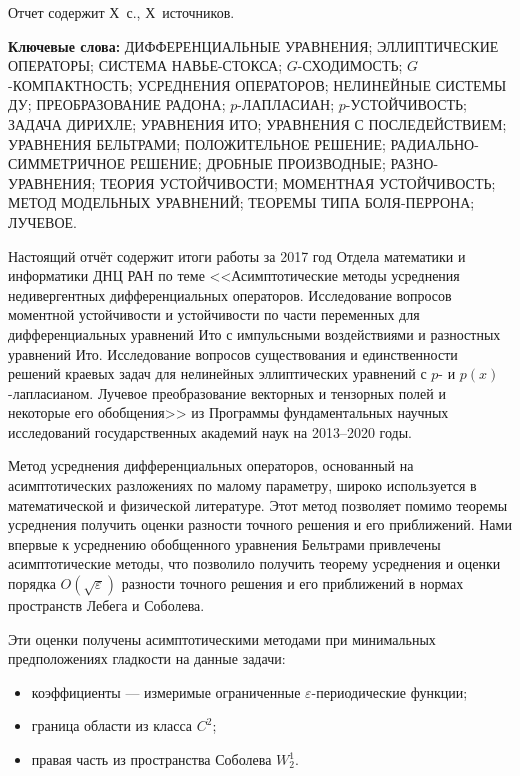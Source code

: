\Referat %

Отчет содержит Х~с., Х~источников.%

\bigskip
\textbf{ Ключевые
	слова:}
ДИФФЕРЕНЦИАЛЬНЫЕ УРАВНЕНИЯ; ЭЛЛИПТИЧЕСКИЕ ОПЕРАТОРЫ; СИСТЕМА НАВЬЕ-СТОКСА; $G$-СХОДИМОСТЬ; $G$-КОМПАКТНОСТЬ; УСРЕДНЕНИЯ ОПЕРАТОРОВ; НЕЛИНЕЙНЫЕ СИСТЕМЫ ДУ;
ПРЕОБРАЗОВАНИЕ РАДОНА;
$p$-ЛАПЛАСИАН; $p$-УСТОЙЧИВОСТЬ; ЗАДАЧА ДИРИХЛЕ; УРАВНЕНИЯ ИТО; УРАВНЕНИЯ С ПОСЛЕДЕЙСТВИЕМ;  УРАВНЕНИЯ БЕЛЬТРАМИ; ПОЛОЖИТЕЛЬНОЕ РЕШЕНИЕ; РАДИАЛЬНО-СИММЕТРИЧНОЕ РЕШЕНИЕ; ДРОБНЫЕ ПРОИЗВОДНЫЕ; РАЗНО- УРАВНЕНИЯ;  ТЕОРИЯ УСТОЙЧИВОСТИ; МОМЕНТНАЯ УСТОЙЧИВОСТЬ; МЕТОД МОДЕЛЬНЫХ УРАВНЕНИЙ; ТЕОРЕМЫ ТИПА БОЛЯ-ПЕРРОНА; ЛУЧЕВОЕ.

\bigskip

Настоящий отчёт содержит итоги работы за 2017 год Отдела математики и информатики ДНЦ РАН по теме
<<Асимптотические методы усреднения недивергентных дифференциальных операторов. Исследование вопросов моментной устойчивости и устойчивости по части переменных для дифференциальных уравнений Ито с импульсными воздействиями и разностных уравнений Ито. Исследование вопросов существования и единственности решений краевых задач для нелинейных эллиптических уравнений с $p$- и $p(x)$-лапласианом. Лучевое преобразование векторных и тензорных полей и некоторые его обобщения>>
из Программы фундаментальных научных исследований государственных академий наук на 2013–2020 годы.



Метод усреднения дифференциальных операторов, основанный на асимптотических разложениях по малому параметру, широко используется  в математической и физической литературе. Этот метод позволяет помимо теоремы усреднения получить оценки разности точного решения и его приближений. Нами впервые к усреднению обобщенного уравнения Бельтрами привлечены асимптотические методы, что позволило получить теорему усреднения и оценки порядка $O(\sqrt{\varepsilon})$ разности точного решения и его приближений в нормах пространств Лебега и Соболева.


Эти оценки получены асимптотическими методами при минимальных предположениях гладкости на данные задачи:

\begin{itemize}
	\item
	коэффициенты --- измеримые ограниченные $\varepsilon$-периодические функции;
	\item
	граница области из класса $C^2$;
	\item
	правая часть из пространства Соболева $W_2^1$.
\end{itemize}

